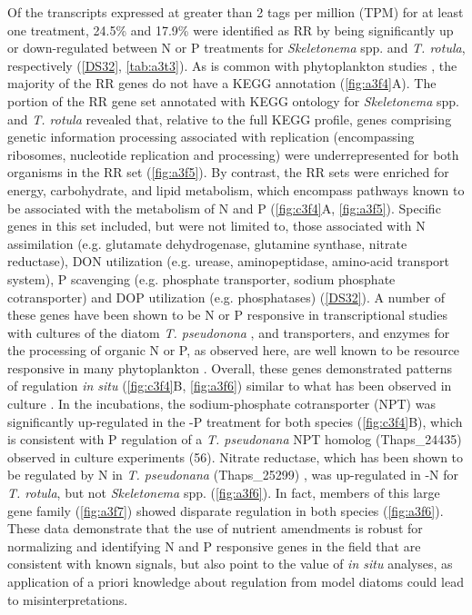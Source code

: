 Of the transcripts expressed at greater than 2 tags per million (TPM) for at least one treatment, 24.5\% and 17.9\% were identified as RR by being significantly up or down-regulated between N or P treatments for \textit{Skeletonema} spp. and \textit{T. rotula}, respectively (\ref{DS32}, \cref{tab:a3t3}). As is common with phytoplankton studies \citep{Marchetti2012a}, the majority of the RR genes do not have a KEGG annotation (\cref{fig:a3f4}A). The portion of the RR gene set annotated with KEGG ontology for \textit{Skeletonema} spp. and \textit{T. rotula} revealed that, relative to the full KEGG profile, genes comprising genetic information processing associated with replication (encompassing ribosomes, nucleotide replication and processing) were underrepresented for both organisms in the RR set (\cref{fig:a3f5}). By contrast, the RR sets were enriched for energy, carbohydrate, and lipid metabolism, which encompass pathways known to be associated with the metabolism of N and P (\cref{fig:c3f4}A, \cref{fig:a3f5}). Specific genes in this set included, but were not limited to, those associated with N assimilation (e.g. glutamate dehydrogenase, glutamine synthase, nitrate reductase), DON utilization (e.g. urease, aminopeptidase, amino-acid transport system), P scavenging (e.g. phosphate transporter, sodium phosphate cotransporter) and DOP utilization (e.g. phosphatases) (\ref{DS32}). A number of these genes have been shown to be N or P responsive in transcriptional studies with cultures of the diatom \textit{T. pseudonona} \citep{Dyhrman2012, Bender2014}, and transporters, and enzymes for the processing of organic N or P, as observed here, are well known to be resource responsive in many phytoplankton \citep{Dyhrman2012, Wurch2011, Dyhrman2006, Bruhn2010}. Overall, these genes demonstrated patterns of regulation \textit{in situ} (\cref{fig:c3f4}B, \cref{fig:a3f6}) similar to what has been observed in culture \citep{Dyhrman2012, Bender2014}. In the incubations, the sodium-phosphate cotransporter (NPT) was significantly up-regulated in the -P treatment for both species (\cref{fig:c3f4}B), which is consistent with P regulation of a \textit{T. pseudonana} NPT homolog (Thaps\_24435) observed in culture experiments (56). Nitrate reductase, which has been shown to be regulated by N in \textit{T. pseudonana} (Thaps\_25299) \citep{Bender2012}, was up-regulated in -N for \textit{T. rotula}, but not \textit{Skeletonema} spp. (\cref{fig:a3f6}). In fact, members of this large gene family (\cref{fig:a3f7}) showed disparate regulation in both species (\cref{fig:a3f6}).  These data demonstrate that the use of nutrient amendments is robust for normalizing and identifying N and P responsive genes in the field that are consistent with known signals, but also point to the value of \textit{in situ} analyses, as application of a priori knowledge about regulation from model diatoms could lead to misinterpretations.\par

